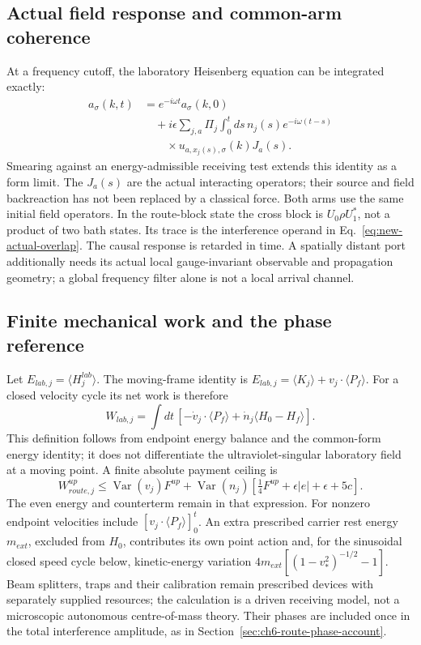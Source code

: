 \subsection{Actual field response and common-arm coherence}
At a frequency cutoff, the laboratory Heisenberg equation can be integrated
exactly:
\begin{equation}
\begin{aligned}
 a_\sigma(k,t)&=e^{-i\omega t}a_\sigma(k,0)\\
 &\quad+i\epsilon\sum_{j,a}\Pi_j\int_0^t ds\,
 n_j(s)e^{-i\omega(t-s)}\\
 &\qquad\times u_{a,x_j(s),\sigma}(k)J_a(s).
\end{aligned}
\label{eq:new-retarded-source}
\end{equation}
Smearing against an energy-admissible receiving test extends this identity
as a form limit. The \(J_a(s)\) are the actual interacting operators;
their source and field backreaction has not been replaced by a classical
force. Both arms use the same initial field operators. In the route-block
state the cross block is \(U_0\rho U_1^*\), not a product of two bath
states. Its trace is the interference operand in
Eq.~\eqref{eq:new-actual-overlap}. The causal response is retarded in
time. A spatially distant port additionally needs its actual local
gauge-invariant observable and propagation geometry; a global frequency
filter alone is not a local arrival channel.

\subsection{Finite mechanical work and the phase reference}
Let \(E_{lab,j}=\langle H_j^{lab}\rangle\). The moving-frame identity is
\(E_{lab,j}=\langle K_j\rangle+v_j\cdot\langle P_f\rangle\).
For a closed velocity cycle its net work is therefore
\[
 W_{lab,j}=\int dt\,\left[-\dot v_j\cdot\langle P_f\rangle
              +\dot n_j\langle H_0-H_f\rangle\right].
\]
This definition follows from endpoint energy balance and the common-form
energy identity; it does not differentiate the ultraviolet-singular
laboratory field at a moving point. A finite absolute payment ceiling is
\[
 W_{route,j}^{up}\leq\operatorname{Var}(v_j)F^{up}
 +\operatorname{Var}(n_j)
 [\tfrac14 F^{up}+\epsilon|e|+\epsilon+5c].
\]
The even energy and counterterm remain in that expression. For nonzero
endpoint velocities include \([v_j\cdot\langle P_f\rangle]_0^t\).
An extra prescribed carrier rest energy \(m_{ext}\), excluded from
\(H_0\), contributes its own point action and, for the sinusoidal closed
speed cycle below, kinetic-energy variation
\(4m_{ext}[(1-v_*^2)^{-1/2}-1]\). Beam splitters, traps and their
calibration remain prescribed devices with separately supplied resources;
the calculation is a driven receiving model, not a microscopic autonomous
centre-of-mass theory. Their phases are included once in the total
interference amplitude, as in Section~\ref{sec:ch6-route-phase-account}.

